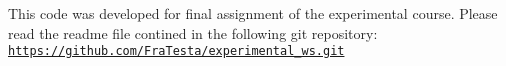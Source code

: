 This code was developed for final assignment of the experimental course. Please read the readme file contined in the following git repository\+: \href{https://github.com/FraTesta/experimental_ws.git}{\tt https\+://github.\+com/\+Fra\+Testa/experimental\+\_\+ws.\+git} 
